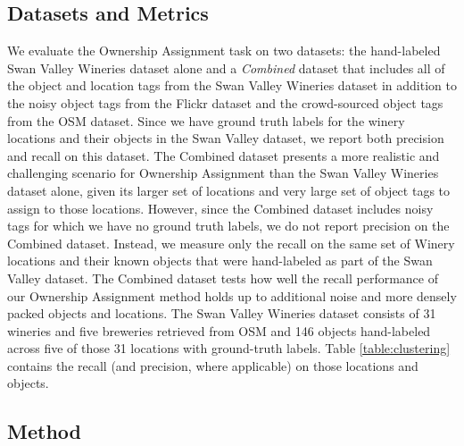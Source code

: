 \subsection{Datasets and Metrics}

We evaluate the Ownership Assignment task on two datasets: the hand-labeled Swan Valley Wineries dataset alone and a \textit{Combined} dataset that includes all of the object and location tags from the Swan Valley Wineries dataset in addition to the noisy object tags from the Flickr dataset and the crowd-sourced object tags from the OSM dataset.
Since we have ground truth labels for the winery locations and their objects in the Swan Valley dataset, we report both precision and recall on this dataset.
The Combined dataset presents a more realistic and challenging scenario for Ownership Assignment than the Swan Valley Wineries dataset alone, given its larger set of locations and very large set of object tags to assign to those locations. However, since the Combined dataset includes noisy tags for which we have no ground truth labels, we do not report precision on the Combined dataset. Instead, we measure only the recall on the same set of Winery locations and their known objects that were hand-labeled as part of the Swan Valley dataset. The Combined dataset tests how well the recall performance of our Ownership Assignment method holds up to additional noise and more densely packed objects and locations.
The Swan Valley Wineries dataset consists of 31 wineries and five breweries retrieved from OSM and 146 objects hand-labeled across five of those 31 locations with ground-truth labels. Table \ref{table:clustering} contains the recall (and precision, where applicable) on those locations and objects.


\subsection{Method}

